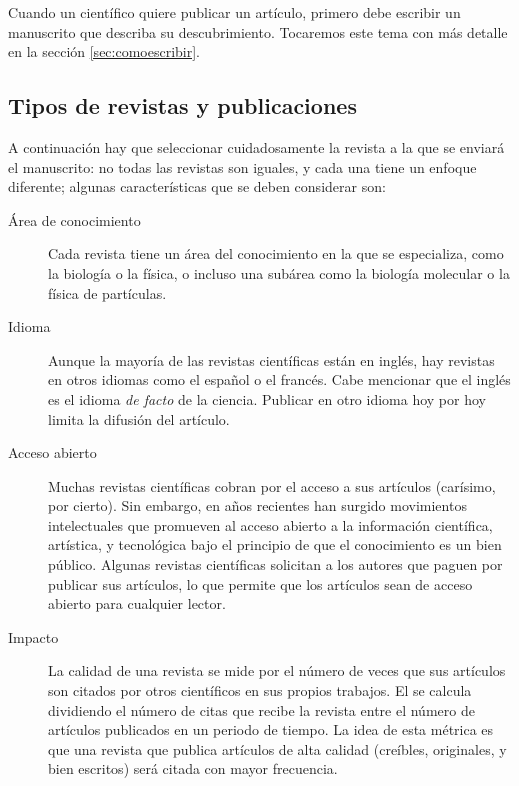 Cuando un científico quiere publicar un artículo, primero debe escribir un
manuscrito que describa su descubrimiento.
Tocaremos este tema con más detalle en la sección \ref{sec:comoescribir}.

\subsection*{Tipos de revistas y publicaciones}
A continuación hay que seleccionar cuidadosamente la revista a la que se enviará
el manuscrito: no todas las revistas son iguales, y cada una tiene un enfoque
diferente; algunas características que se deben considerar son:

\begin{description}
    \item[Área de conocimiento] Cada revista tiene un área del conocimiento en
        la que se especializa, como la biología o la física, o incluso una
        subárea como la biología molecular o la física de partículas.
    \item[Idioma] Aunque la mayoría de las revistas científicas están en inglés,
        hay revistas en otros idiomas como el español o el francés.
        Cabe mencionar que el inglés es el idioma \emph{de facto} de la
        ciencia.
        Publicar en otro idioma hoy por hoy limita la difusión del artículo.
    \item[Acceso abierto] Muchas revistas científicas cobran por el acceso a sus
        artículos (carísimo, por cierto).
        Sin embargo, en años recientes han surgido movimientos intelectuales
        que promueven al acceso abierto a la información científica, artística,
        y tecnológica bajo el principio de que el conocimiento es un bien
        público.
        Algunas revistas científicas solicitan a los autores que paguen por
        publicar sus artículos, lo que permite que los artículos sean de acceso
        abierto para cualquier lector.
    \item[Impacto] La calidad de una revista se mide por el número de veces que
        sus artículos son citados por otros científicos en sus propios trabajos.
        El  se calcula dividiendo el número de
        citas que recibe la revista entre el número de artículos publicados en
        un periodo de tiempo.
        La idea de esta métrica es que una revista que publica artículos de alta
        calidad (creíbles, originales, y bien escritos) será citada con mayor
        frecuencia.
\end{description}

